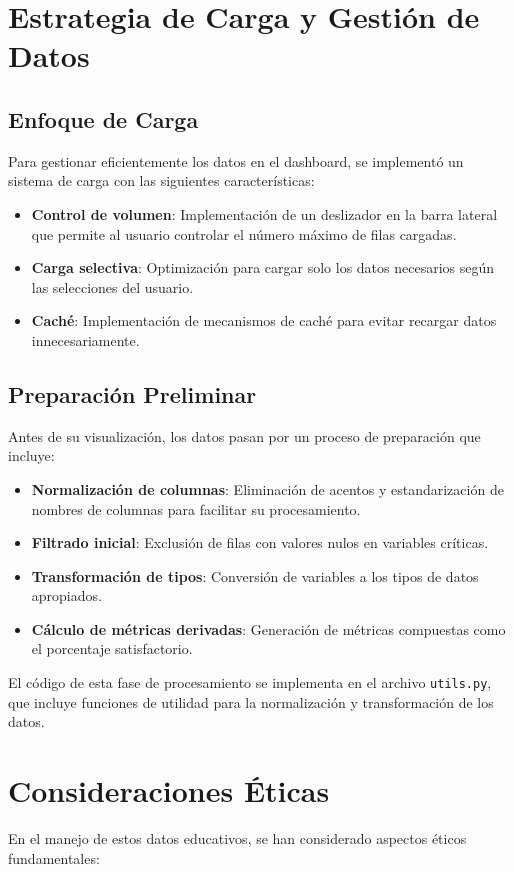 \section{Estrategia de Carga y Gestión de Datos}

\subsection{Enfoque de Carga}
Para gestionar eficientemente los datos en el dashboard, se implementó un sistema de carga con las siguientes características:

\begin{itemize}
    \item \textbf{Control de volumen}: Implementación de un deslizador en la barra lateral que permite al usuario controlar el número máximo de filas cargadas.
    \item \textbf{Carga selectiva}: Optimización para cargar solo los datos necesarios según las selecciones del usuario.
    \item \textbf{Caché}: Implementación de mecanismos de caché para evitar recargar datos innecesariamente.
\end{itemize}

\subsection{Preparación Preliminar}
Antes de su visualización, los datos pasan por un proceso de preparación que incluye:

\begin{itemize}
    \item \textbf{Normalización de columnas}: Eliminación de acentos y estandarización de nombres de columnas para facilitar su procesamiento.
    \item \textbf{Filtrado inicial}: Exclusión de filas con valores nulos en variables críticas.
    \item \textbf{Transformación de tipos}: Conversión de variables a los tipos de datos apropiados.
    \item \textbf{Cálculo de métricas derivadas}: Generación de métricas compuestas como el porcentaje satisfactorio.
\end{itemize}

El código de esta fase de procesamiento se implementa en el archivo \texttt{utils.py}, que incluye funciones de utilidad para la normalización y transformación de los datos.

\section{Consideraciones Éticas}
En el manejo de estos datos educativos, se han considerado aspectos éticos fundamentales:

